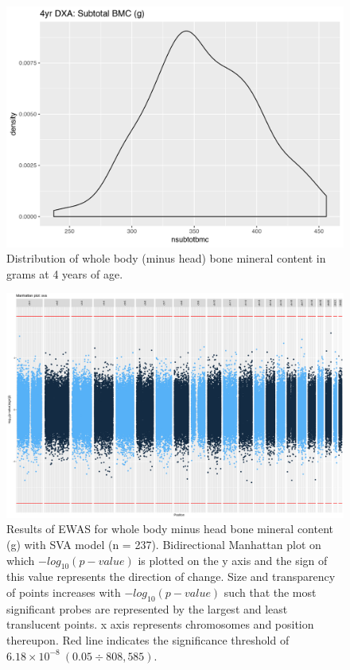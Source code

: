 \documentclass[
]{book}
\begin{document}
\begin{figure}

{\centering \includegraphics[width=0.8\linewidth]{figs/MAVIDOSIInsubtotbmc} 

}

\caption{Distribution of whole body (minus head) bone mineral content in grams at 4 years of age.}\label{fig:MAVIDOSIInsubtotbmc}
\end{figure}



\begin{figure}

{\centering \includegraphics[width=0.8\linewidth]{figs/MAVIDOSIInsubtotbmcEPICewasManhattanSVA} 

}

\caption{Results of EWAS for whole body minus head bone mineral content (g) with SVA model (n = 237). Bidirectional Manhattan plot on which \(-log_{10}(p-value)\) is plotted on the y axis and the sign of this value represents the direction of change. Size and transparency of points increases with \(-log_{10}(p-value)\) such that the most significant probes are represented by the largest and least translucent points. x axis represents chromosomes and position thereupon. Red line indicates the significance threshold of \(6.18\times10^{-8}~(0.05\div808,585)\).}\label{fig:MAVIDOSIInsubtotbmcEPICewasManhattanSVA}
\end{figure}
\end{document}
